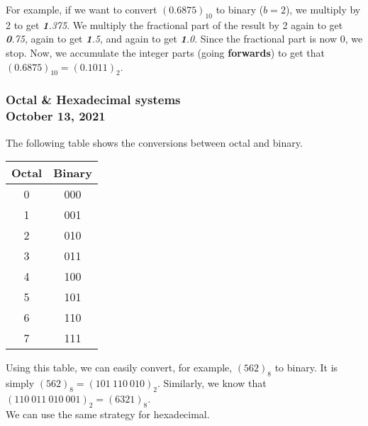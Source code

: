 \documentclass[]{article}
\begin{document}
For example, if we want to convert $(0.6875)_{10}$ to binary ($b = 2$), we multiply by 2 to get \textit{\textbf{1}.375}. We multiply the fractional part of the result by 2 again to get \textit{\textbf{0}.75}, again to get \textit{\textbf{1}.5}, and again to get \textit{\textbf{1}.0}. Since the fractional part is now 0, we stop. Now, we accumulate the integer parts (going \textbf{forwards}) to get that $(0.6875)_{10} = (0.1011)_2$.\\

\subsubsection{Octal \& Hexadecimal systems\\ {\normalfont October 13, 2021}}
\bigbreak

The following table shows the conversions between octal and binary.

\begin{center}
	\begin{table}[h]\centering
		\begin{tabular}{|c|c|}
			\hline
			Octal & Binary \\ \hline
			0     & 000     \\
			1     & 001     \\
			2     & 010     \\
			3     & 011     \\
			4     & 100     \\
			5     & 101     \\
			6     & 110     \\
			7     & 111    \\\hline
		\end{tabular}
	\end{table}\bigbreak
\end{center}

Using this table, we can easily convert, for example, $(562)_8$ to binary. It is simply $(562)_8 = (101~110~010)_2$. Similarly, we know that $(110~011~010~001)_2 = (6321)_8$.\\

We can use the same strategy for hexadecimal.
\end{document}
